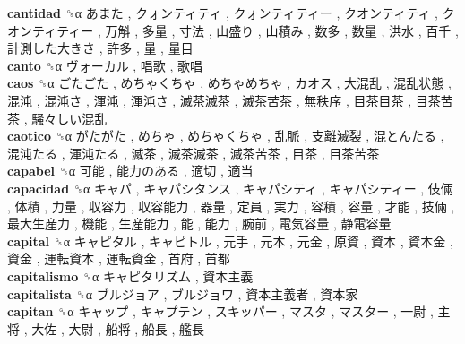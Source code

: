 \textbf{cantidad} ␝α   あまた ,  クォンティティ ,  クォンティティー ,  クオンティティ ,  クオンティティー ,  万斛 ,  多量 ,  寸法 ,  山盛り ,  山積み ,  数多 ,  数量 ,  洪水 ,  百千 ,  計測した大きさ ,  許多 ,  量 ,  量目   \\
\textbf{canto} ␝α   ヴォーカル ,  唱歌 ,  歌唱   \\
\textbf{caos} ␝α   ごたごた ,  めちゃくちゃ ,  めちゃめちゃ ,  カオス ,  大混乱 ,  混乱状態 ,  混沌 ,  混沌さ ,  渾沌 ,  渾沌さ ,  滅茶滅茶 ,  滅茶苦茶 ,  無秩序 ,  目茶目茶 ,  目茶苦茶 ,  騒々しい混乱   \\
\textbf{caotico} ␝α   がたがた ,  めちゃ ,  めちゃくちゃ ,  乱脈 ,  支離滅裂 ,  混とんたる ,  混沌たる ,  渾沌たる ,  滅茶 ,  滅茶滅茶 ,  滅茶苦茶 ,  目茶 ,  目茶苦茶   \\
\textbf{capabel} ␝α   可能 ,  能力のある ,  適切 ,  適当   \\
\textbf{capacidad} ␝α   キャパ ,  キャパシタンス ,  キャパシティ ,  キャパシティー ,  伎倆 ,  体積 ,  力量 ,  収容力 ,  収容能力 ,  器量 ,  定員 ,  実力 ,  容積 ,  容量 ,  才能 ,  技倆 ,  最大生産力 ,  機能 ,  生産能力 ,  能 ,  能力 ,  腕前 ,  電気容量 ,  静電容量   \\
\textbf{capital} ␝α   キャピタル ,  キャピトル ,  元手 ,  元本 ,  元金 ,  原資 ,  資本 ,  資本金 ,  資金 ,  運転資本 ,  運転資金 ,  首府 ,  首都   \\
\textbf{capitalismo} ␝α   キャピタリズム ,  資本主義   \\
\textbf{capitalista} ␝α   ブルジョア ,  ブルジョワ ,  資本主義者 ,  資本家   \\
\textbf{capitan} ␝α   キャップ ,  キャプテン ,  スキッパー ,  マスタ ,  マスター ,  一尉 ,  主将 ,  大佐 ,  大尉 ,  船将 ,  船長 ,  艦長   \\
